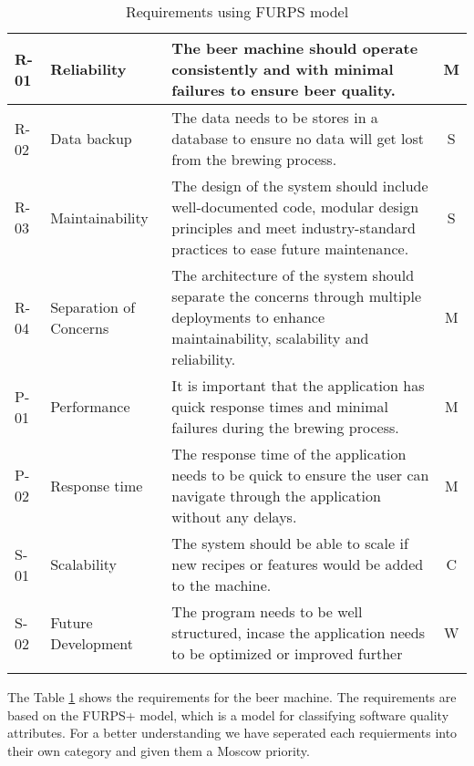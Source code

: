 \begin{center}
\begin{longtable}{|p{1cm}|p{4cm}|p{8.5cm}|c|}
        R-01   & Reliability                & The beer machine should operate consistently and with minimal failures to ensure beer quality.                                                                & M \\ \hline
        R-02   & Data backup                & The data needs to be stores in a database to ensure no data will get lost from the brewing process.                                                           & S \\ \hline
        R-03   & Maintainability            & The design of the system should include well-documented code, modular design principles and meet industry-standard practices to ease future maintenance.      & S \\ \hline 
        R-04   & Separation of Concerns     & The architecture of the system should separate the concerns through multiple deployments to enhance maintainability, scalability and reliability.             & M \\ \hline
        P-01   & Performance                & It is important that the application has quick response times and minimal failures during the brewing process.                                                & M \\ \hline
        P-02   & Response time              & The response time of the application needs to be quick to ensure the user can navigate through the application without any delays.                            & M \\ \hline
        S-01   & Scalability                & The system should be able to scale if new recipes or features would be added to the machine.                                                                  & C \\ \hline
        S-02   & Future Development         & The program needs to be well structured, incase the application needs to be optimized or improved further                                                     & W \\ \hline
        

        \caption{Requirements using FURPS model}
        \label{tab:requirements}
    \end{longtable}
\end{center}

The Table \ref{tab:requirements} shows the requirements for the beer machine. The requirements are based on the FURPS+ model, which is a model for classifying software quality attributes. For a better understanding we have seperated each requierments into their own category and given them a Moscow priority.







